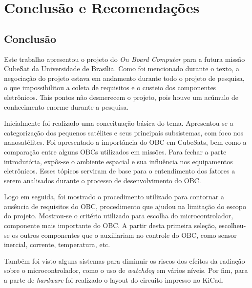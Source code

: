 \chapter[Conclusão e Recomendações]{Conclusão e Recomendações}
\label{secaoCR}
\section{Conclusão}

Este trabalho apresentou o projeto do \textit{On Board Computer} para a futura missão CubeSat da Universidade de Brasília. Como foi mencionado durante o texto, a negociação do projeto estava em andamento durante todo o projeto de pesquisa, o que impossibilitou a coleta de requisitos e o custeio dos componentes eletrônicos. Tais pontos não desmerecem o projeto, pois houve um acúmulo de conhecimento enorme durante a pesquisa. 

Inicialmente foi realizado uma conceituação básica do tema. Apresentou-se a categorização dos pequenos satélites e seus principais subsistemas, com foco nos nanosatélites. Foi apresentado a importância do OBC em CubeSats, bem como a comparação entre alguns OBCs utilizados em missões.  Para fechar a parte introdutória, expôs-se o ambiente espacial e sua influência nos equipamentos eletrônicos. Esses tópicos serviram de base para o entendimento dos fatores a serem analisados durante o processo de desenvolvimento do OBC.

Logo em seguida, foi mostrado o procedimento utilizado para contornar a ausência de requisitos do OBC, procedimento que ajudou na limitação do escopo do projeto. Mostrou-se o critério utilizado para escolha do microcontrolador, componente mais importante do OBC. A partir desta primeira seleção, escolheu-se os outros componentes que o auxiliariam no controle do OBC, como sensor inercial, corrente, temperatura, etc. 

Também foi visto alguns sistemas para diminuir os riscos dos efeitos da radiação sobre o microcontrolador, como o uso de \textit{watchdog} em vários níveis. Por fim, para a parte de \textit{hardware} foi realizado o layout do circuito impresso no KiCad.

